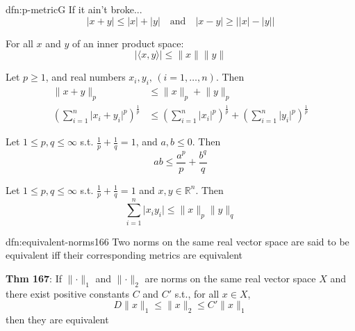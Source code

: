 \documentclass[landscape, 8pt]{extarticle}
\begin{document}
\begin{multicols}{3}
\begin{thm}{dfn:p-metric}{G}
    If it ain't broke...
    \[\lvert x + y \rvert \le \lvert x \rvert + \lvert y \rvert \quad \text{and} \quad \lvert x - y \rvert \ge \lvert \lvert x \rvert - \lvert y \rvert \rvert\]


    For all $x$ and $y$ of an inner product space:
    \[\lvert \langle x, y \rangle \rvert \le \lVert x \rVert \lVert y \rVert\]


    Let $p \ge 1$, and real numbers $x_{i}, y_{i},\,(i = 1,\dots,n)$. Then
    \begin{align*}
        \lVert x + y \rVert_{p} &\le \lVert x \rVert_{p} + \lVert y \rVert_{p} \\
        \left(\sum_{i = 1}^{n} \lvert x_{i} + y_{i} \rvert^{p}\right)^{\frac{1}{p}} &\le \left(\sum_{i = 1}^{n} \lvert x_{i} \rvert^{p}\right)^{\frac{1}{p}} + \left(\sum_{i = 1}^{n} \lvert y_{i} \rvert^{p}\right)^{\frac{1}{p}}
    \end{align*}

    
    Let $1 \le p, q \le \infty$ s.t. $\frac{1}{p} + \frac{1}{q} = 1$, and $a, b\le 0$. Then
    \[ab \le \frac{a^{p}}{p} + \frac{b^{q}}{q}\]


    Let $1 \le p, q \le \infty$ s.t. $\frac{1}{p} + \frac{1}{q} = 1$ and $x, y\in \mathbb{R}^{n}$. Then
    \[\sum_{i = 1}^{n} \lvert x_{i}y_{i} \rvert \le \lVert x \rVert_{p} \lVert y \rVert_{q}\]

\end{thm}


\begin{dfn}{dfn:equivalent-norms}{166}
    \vspace{-5pt}
    Two norms on the same real vector space are said to be equivalent iff their corresponding metrics are equivalent

    \longrule{0.08ex}
    \textbf{Thm 167}: If $\lVert \cdot \rVert_{1}$ and $\lVert \cdot \rVert_{2}$ are norms on the same real vector space $X$ and there exist positive constants $C$ and $C'$ s.t., for all $x\in X$,
    \[D \lVert x \rVert_{1} \le \lVert x \rVert_{2} \le C' \lVert x \rVert_{1}\]
    then they are equivalent




\end{dfn}
\end{multicols}
\end{document}
